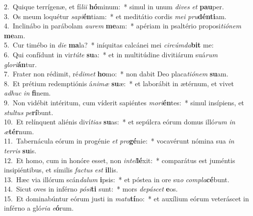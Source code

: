 {2.~}Quique terrígenæ, et fí\textit{li}\textit{i} \textbf{hó}minum:~* simul in unum \textit{di}\textit{ves} \textit{et} \textbf{pau}per.\\
{3.~}Os meum loquétur \textit{sa}\textit{pi}\textbf{én}tiam:~* et meditátio cordis \textit{me}\textit{i} \textit{pru}\textbf{dén}\textbf{ti}am.\\
{4.~}Inclinábo in parábolam \textit{au}\textit{rem} \textbf{me}am:~* apériam in psaltério proposi\textit{ti}\textit{ó}\textit{nem} \textbf{me}am.\\
{5.~}Cur timébo in \textit{di}\textit{e} \textbf{ma}la?~* iníquitas calcánei mei \textit{cir}\textit{cúm}\textit{da}\textbf{bit} me:\\
{6.~}Qui confídunt in vir\textit{tú}\textit{te} \textbf{su}a:~* et in multitúdine divitiárum suá\textit{rum} \textit{glo}\textit{ri}\textbf{án}tur.\\
{7.~}Frater non rédimit, ré\textit{di}\textit{met} \textbf{ho}mo:~* non dabit Deo placa\textit{ti}\textit{ó}\textit{nem} \textbf{su}am.\\
{8.~}Et prétium redemptiónis á\textit{ni}\textit{mæ} \textbf{su}æ:~* et laborábit in ætérnum, et vivet \textit{a}\textit{dhuc} \textit{in} \textbf{fi}nem.\\
{9.~}Non vidébit intéritum, cum víderit sapiéntes \textit{mo}\textit{ri}\textbf{én}tes:~* simul insípiens, et \textit{stul}\textit{tus} \textit{pe}\textbf{rí}bunt.\\
{10.~}Et relínquent aliénis diví\textit{ti}\textit{as} \textbf{su}as:~* et sepúlcra eórum domus illó\textit{rum} \textit{in} \textit{æ}\textbf{tér}num.\\
{11.~}Tabernácula eórum in progénie \textit{et} \textit{pro}\textbf{gé}nie:~* vocavérunt nómina sua \textit{in} \textit{ter}\textit{ris} \textbf{su}is.\\
{12.~}Et homo, cum in honóre esset, non \textit{in}\textit{tel}\textbf{lé}xit:~* comparátus est juméntis insipiéntibus, et símilis \textit{fa}\textit{ctus} \textit{est} \textbf{il}lis.\\
{13.~}Hæc via illórum scán\textit{da}\textit{lum} \textbf{i}psis:~* et póstea in ore su\textit{o} \textit{com}\textit{pla}\textbf{cé}bunt.\\
{14.~}Sicut oves in inférno \textit{pó}\textit{si}\textbf{ti} sunt:~* mors \textit{de}\textit{pá}\textit{scet} \textbf{e}os.\\
{15.~}Et dominabúntur eórum justi in \textit{ma}\textit{tu}\textbf{tí}no:~* et auxílium eórum veteráscet in inférno a gló\textit{ri}\textit{a} \textit{e}\textbf{ó}rum.\\
